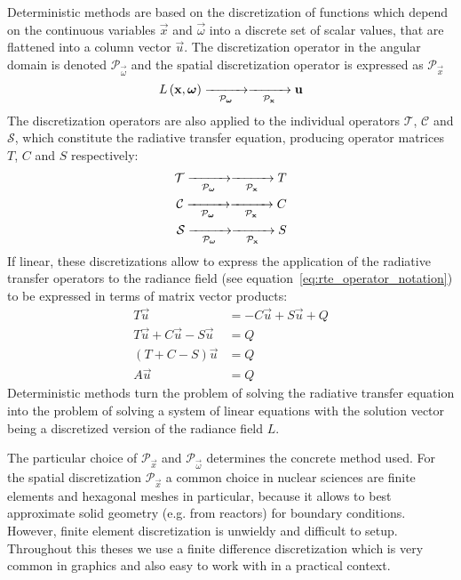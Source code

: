 Deterministic methods are based on the discretization of functions which depend on the continuous variables $\vec{x}$ and $\vec{\omega}$ into a discrete set of scalar values, that are flattened into a column vector $\vec{u}$. The discretization operator in the angular domain is denoted $\mathcal{P}_{\vec{\omega}}$ and the spatial discretization operator is expressed as $\mathcal{P}_{\vec{x}}$
\begin{align*}
L\left(\vec{x}, \vec{\omega}\right)
\xrightarrow[\mathcal{P}_{\vec{\omega}}]{\makebox[1cm]{}}
\xrightarrow[\mathcal{P}_{\vec{x}}]{\makebox[1cm]{}}
\vec{u}
\end{align*}
The discretization operators are also applied to the individual operators $\mathcal{T}$, $\mathcal{C}$ and $\mathcal{S}$, which constitute the radiative transfer equation, producing operator matrices $T$, $C$ and $S$ respectively:
\begin{align*}
\mathcal{T}
\xrightarrow[\mathcal{P}_{\vec{\omega}}]{\makebox[1cm]{}}
\xrightarrow[\mathcal{P}_{\vec{x}}]{\makebox[1cm]{}}
T
\\
\mathcal{C}
\xrightarrow[\mathcal{P}_{\vec{\omega}}]{\makebox[1cm]{}}
\xrightarrow[\mathcal{P}_{\vec{x}}]{\makebox[1cm]{}}
C
\\
\mathcal{S}
\xrightarrow[\mathcal{P}_{\vec{\omega}}]{\makebox[1cm]{}}
\xrightarrow[\mathcal{P}_{\vec{x}}]{\makebox[1cm]{}}
S
\end{align*}
If linear, these discretizations allow to express the application of the radiative transfer operators to the radiance field (see equation~\ref{eq:rte_operator_notation}) to be expressed in terms of matrix vector products:
\begin{align*}
T\vec{u}&=-C\vec{u}+S\vec{u}+Q
\\
T\vec{u}+C\vec{u}-S\vec{u}&=Q
\\
(T+C-S)\vec{u}&=Q
\\
A\vec{u}&=Q
\end{align*}
Deterministic methods turn the problem of solving the radiative transfer equation into the problem of solving a system of linear equations with the solution vector being a discretized version of the radiance field $L$.

The particular choice of $\mathcal{P}_{\vec{x}}$ and $\mathcal{P}_{\vec{\omega}}$ determines the concrete method used. For the spatial discretization $\mathcal{P}_{\vec{x}}$ a common choice in nuclear sciences are finite elements and hexagonal meshes in particular, because it allows to best approximate solid geometry (e.g. from reactors) for boundary conditions. However, finite element discretization is unwieldy and difficult to setup. Throughout this theses we use a finite difference discretization which is very common in graphics and also easy to work with in a practical context.

